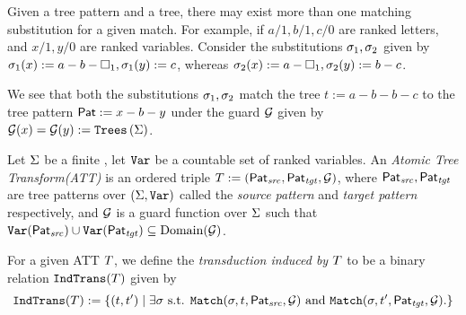 \begin{example}\label{exp:multipleMatching}
    Given a tree pattern and a tree, there may exist more than one matching substitution for a given match. For example, if $a/1, b/1, c/0$ are ranked letters, and $x/1, y/0$ are ranked variables.
    Consider the substitutions $\sigma_1, \sigma_2$ given by $\sigma_1(x) := a-b-\square_1, \sigma_1(y) := c$, whereas $\sigma_2(x) := a-\square_1, \sigma_2(y) := b-c$.

    We see that both the substitutions $\sigma_1, \sigma_2$ match the tree $t := a-b-b-c$ to the tree pattern $\mathsf{Pat} := x-b-y$ under the guard $\mathcal{G}$ given by $\mathcal{G}(x) = \mathcal{G}(y) := \texttt{Trees}\left(\Sigma\right)$.
\end{example}


\begin{definition}\label{def:atomicTreeTransform}
    Let $\Sigma$ be a finite \rab, let $\texttt{Var}$ be a countable set of ranked variables. An \emph{Atomic Tree Transform(ATT)} is an ordered triple $T := (\mathsf{Pat}_{\mathit{src}}, \mathsf{Pat}_{\mathit{tgt}}, \mathcal{G})$, where $\mathsf{Pat}_{\mathit{src}}, \mathsf{Pat}_{\mathit{tgt}}$ are tree patterns over $(\Sigma, \texttt{Var})$ called the \emph{source pattern} and \emph{target pattern} respectively, and $\mathcal{G}$ is a guard function over $\Sigma$ such that $\texttt{Var}(\mathsf{Pat}_{\mathit{src}}) \cup \texttt{Var}(\mathsf{Pat}_{\mathit{tgt}}) \subseteq \operatorname{Domain}(\mathcal{G})$.
\end{definition}

For a given ATT $T$, we define the \emph{transduction induced by $T$} to be a binary relation $\texttt{IndTrans}(T)$ given by
\[
    \texttt{IndTrans}(T) := \left\{ (t, t') \mid \exists \sigma \mbox{ s.t. } \texttt{Match}(\sigma, t, \mathsf{Pat}_{\mathit{src}}, \mathcal{G}) \mbox{ and } \texttt{Match}(\sigma, t', \mathsf{Pat}_{\mathit{tgt}}, \mathcal{G}). \right\}
\]

